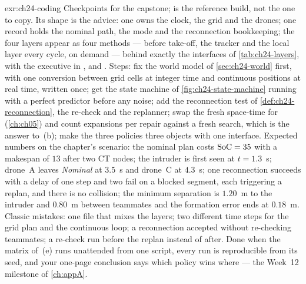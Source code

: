 
\begin{solution}{exr:ch24-coding}
Checkpoints for the capstone;  is the reference build, not the one
to copy. Its shape is the advice: one  owns the clock, the grid and
the drones; one  record holds the nominal path, the mode and the reconnection
bookkeeping; the four layers appear as four methods ---  before take-off, the
tracker and the local layer every cycle,  on demand --- behind exactly the
interfaces of \cref{tab:ch24-layers}, with the executive in ,
 and . Steps: fix the world model of
\cref{sec:ch24-world} first, with one conversion between grid cells at integer time and
continuous positions at real time, written once; get the state machine of
\cref{fig:ch24-state-machine} running with a perfect predictor before any noise; add the
reconnection test of \cref{def:ch24-reconnection}, the re-check and the replanner; swap
the fresh space-time \astar for \dstarlite (\cref{ch:ch05}) and count expansions per
repair against a fresh search, which is the answer to~(b); make the three policies three
objects with one interface. Expected numbers on the chapter's scenario: the nominal plan
costs $\mathrm{SoC}=35$ with a makespan of $13$ after two CT nodes; the intruder is first seen
at $t=1.3$~s; drone~A leaves \emph{Nominal} at $3.5$~s and drone~C at $4.3$~s; one
reconnection succeeds with a delay of one step and two fail on a blocked segment, each
triggering a replan, and there is no collision; the minimum separation is $1.20$~m to the
intruder and $0.80$~m between teammates and the formation error ends at $0.18$~m. Classic
mistakes: one file that mixes the layers; two different time steps for the grid plan and
the continuous loop; a reconnection accepted without re-checking teammates; a re-check run
before the replan instead of after. Done when the matrix of~(e) runs unattended from one
script, every run is reproducible from its seed, and your one-page conclusion says which
policy wins where --- the Week~12 milestone of \cref{ch:appA}.
\end{solution}
